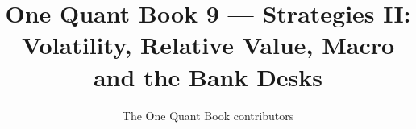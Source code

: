 \documentclass[11pt,a4paper,twoside,openany]{book}
\title{One Quant Book 9 --- Strategies II: Volatility, Relative Value, Macro and the Bank Desks}
\author{The One Quant Book contributors}
\date{\bookdate}
\begin{document}
\frontmatter



\tableofcontents

\mainmatter


\appendix
\part{\omsolutionspart}


\backmatter
\printindex
\end{document}
